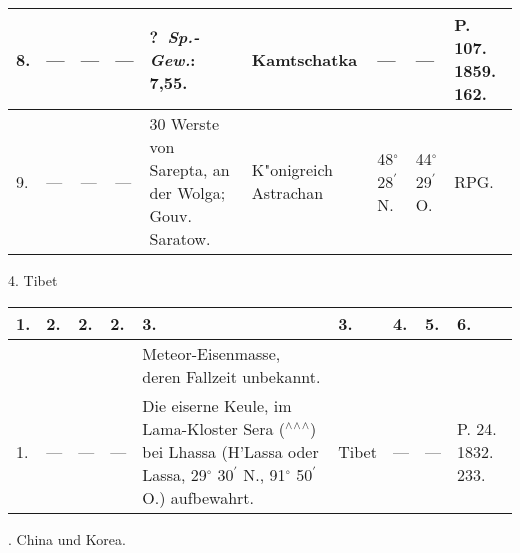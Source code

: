 \documentclass[a4paper, 8pt, oneside, polutonikogreek, german]{article}
\begin{document}
\begin{center}
\begin{longtable}{|p{3mm}|p{5mm}|p{4mm}|p{13mm}|p{22mm}|p{15mm}|p{10mm}|p{10mm}|p{13mm}|}
        8. & --- & --- & --- & ? \emph{Sp.-Gew.}: 7,55. & Kamtschatka & --- & --- & P. 107. 1859. 162. \\ \hline
        9. & --- & --- & --- & 30 Werste von Sarepta, an der Wolga; Gouv. Saratow. & K"onigreich Astrachan & 48$^\circ$ 28$^\prime$ N. & 44$^\circ$ 29$^\prime$ O. & RPG. \\ \hline
    \end{longtable}
\end{center}
4. Tibet
\begin{table}[H]
    \footnotesize
    \begin{longtable}{|p{3mm}|p{5mm}|p{4mm}|p{13mm}|p{22mm}|p{14mm}|p{10mm}|p{10mm}|p{13mm}|}
    \hline
        1. & 2. & 2. & 2. & 3. & 3. & 4. & 5. & 6. \\ \hline
          &   &   &   & Meteor-Eisenmasse, deren Fallzeit unbekannt. &   &   &   &   \\ \hline
        1. & --- & --- & --- & Die eiserne Keule, im Lama-Kloster Sera ($^\wedge$$^\wedge$$^\wedge$) bei Lhassa (H’Lassa oder Lassa, 29$^\circ$ 30$^\prime$ N., 91$^\circ$ 50$^\prime$ O.) aufbewahrt. & Tibet & --- & --- & P. 24. 1832. 233. \\ \hline
    \end{longtable}
\end{table}
. China und Korea.
\end{document}
